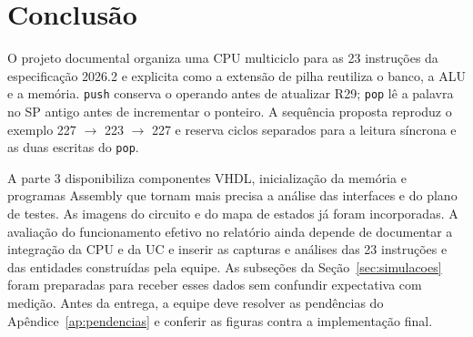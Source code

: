 \section{Conclusão}\label{sec:conclusao}

O projeto documental organiza uma CPU multiciclo para as 23 instruções da especificação 2026.2 e explicita como a extensão de pilha reutiliza o banco, a ALU e a memória. \texttt{push} conserva o operando antes de atualizar R29; \texttt{pop} lê a palavra no SP antigo antes de incrementar o ponteiro. A sequência proposta reproduz o exemplo 227 $\to$ 223 $\to$ 227 e reserva ciclos separados para a leitura síncrona e as duas escritas do \texttt{pop}.

A parte 3 disponibiliza componentes VHDL, inicialização da memória e programas Assembly que tornam mais precisa a análise das interfaces e do plano de testes. As imagens do circuito e do mapa de estados já foram incorporadas. A avaliação do funcionamento efetivo no relatório ainda depende de documentar a integração da CPU e da UC e inserir as capturas e análises das 23 instruções e das entidades construídas pela equipe. As subseções da Seção~\ref{sec:simulacoes} foram preparadas para receber esses dados sem confundir expectativa com medição. Antes da entrega, a equipe deve resolver as pendências do Apêndice~\ref{ap:pendencias} e conferir as figuras contra a implementação final.
